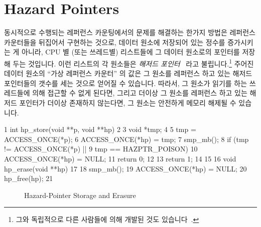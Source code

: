 
\section{Hazard Pointers}
\label{sec:defer:Hazard Pointers}

동시적으로 수행되는 레퍼런스 카운팅에서의 문제를 해결하는 한가지 방법은
레퍼런스 카운터들을 뒤집어서 구현하는 것으로,
데이터 원소에 저장되어 있는 정수를 증가시키는 게 아니라, CPU 별 (또는 쓰레드별)
리스트들에 그 데이터 원소로의 포인터를 저장해 두는 것입니다.
이런 리스트의 각 원소들은 \emph{해저드 포인터}~\cite{MagedMichael04a} 라고
불립니다.\footnote{
	그와 독립적으로 다른 사람들에 의해 개발된 것도
	있습니다~\cite{HerlihyLM02}.}
주어진 데이터 원소의 ``가상 레퍼런스 카운터'' 의 값은 그 원소를 레퍼런스 하고
있는 해저드 포인터들의 갯수를 세는 것으로 얻어질 수 있습니다.
따라서, 그 원소가 읽기를 하는 쓰레드들에 의해 접근할 수 없게 된다면, 그리고
더이상 그 원소를 레퍼런스 하고 있는 해저드 포인터가 더이상 존재하지 않는다면,
그 원소는 안전하게 메모리 해제될 수 있습니다.

{ \scriptsize
\begin{verbbox}
 1 int hp_store(void **p, void **hp)
 2 {
 3   void *tmp;
 4 
 5   tmp = ACCESS_ONCE(*p);
 6   ACCESS_ONCE(*hp) = tmp;
 7   smp_mb();
 8   if (tmp != ACCESS_ONCE(*p) ||
 9       tmp == HAZPTR_POISON) {
10     ACCESS_ONCE(*hp) = NULL;
11     return 0;
12   }
13   return 1;
14 }
15 
16 void hp_erase(void **hp)
17 {
18   smp_mb();
19   ACCESS_ONCE(*hp) = NULL;
20   hp_free(hp);
21 }
\end{verbbox}
}
\begin{figure}[tbp]
\centering
\theverbbox
\caption{Hazard-Pointer Storage and Erasure}
\label{fig:defer:Hazard-Pointer Storage and Erasure}
\end{figure}

